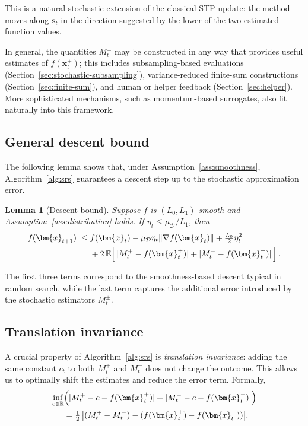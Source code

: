 \documentclass[twoside]{article}
\theoremstyle{plain}
\newtheorem{lemma}{Lemma}[section]
\theoremstyle{definition}
\theoremstyle{remark}
\def\vs{{\bm{s}}}
\def\vx{{\bm{x}}}
\newcommand{\E}{\mathbb{E}}
\begin{document}
This is a natural stochastic extension of the classical STP update: the method 
moves along $\vs_t$ in the direction suggested by the lower of the two estimated 
function values.

In general, the quantities $M_t^\pm$ may be constructed in any way that provides
useful estimates of $f(\vx_t^\pm)$; this includes subsampling-based evaluations
(Section~\ref{sec:stochastic-subsampling}), variance-reduced finite-sum
constructions (Section~\ref{sec:finite-sum}), and human or helper feedback
(Section~\ref{sec:helper}). More sophisticated mechanisms, such as
momentum-based surrogates, also fit naturally into this framework.


\subsection{General descent bound}

The following lemma shows that, under Assumption~\ref{ass:smoothness}, Algorithm~\ref{alg:srs} 
guarantees a descent step up to the stochastic approximation error.

\begin{lemma}[Descent bound]
\label{lem:descent}
Suppose $f$ is $(L_0,L_1)$-smooth and Assumption~\ref{ass:distribution} holds. 
If $\eta_t \leq \mu_{\mathcal{D}}/L_1$, then
\begin{align}
    f(\vx_{t+1}) \;\leq\; &f(\vx_t) 
    - \mu_{\mathcal{D}} \eta_t \|\nabla f(\vx_t)\|
    + \tfrac{L_0}{2} \eta_t^2 \notag \\
    &+ 2\,\E\!\left[\, 
        |M_t^+ - f(\vx_t^+)| 
        + |M_t^- - f(\vx_t^-)| 
    \,\right].
\end{align}
\end{lemma}

The first three terms correspond to the smoothness-based descent typical in random search, 
while the last term captures the additional error introduced by the stochastic 
estimators $M_t^\pm$.

\subsection{Translation invariance}\label{translation_subsec}

A crucial property of Algorithm~\ref{alg:srs} is \emph{translation invariance}: 
adding the same constant $c_t$ to both $M_t^+$ and $M_t^-$ does not change 
the outcome. This allows us to optimally shift the estimates and reduce the error term. 
Formally,
\begin{align}
\inf_{c \in \mathbb{R}} 
&\Big( |M_t^+ - c - f(\vx_t^+)| + |M_t^- - c - f(\vx_t^-)| \Big) \notag \\
&= \tfrac{1}{2} \, \big| (M_t^+ - M_t^-) - ( f(\vx_t^+) - f(\vx_t^-)) \big|.\label{eq5:TransSym}
\end{align}
\end{document}
